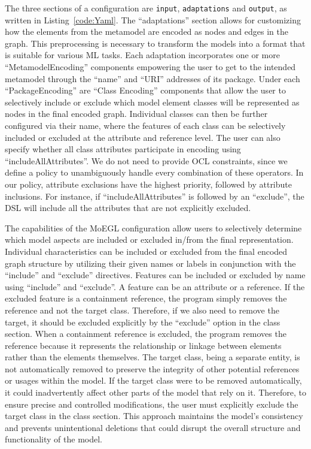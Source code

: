 \documentclass[journal,article,submit,moreauthors,technologies]{Definitions/mdpi}
\newcommand{\rev}[1]{#1}
\begin{document}
\rev{The three sections of a configuration are \texttt{input}, \texttt{adaptations} and \texttt{output}, as written in Listing~\ref{code:Yaml}.} The ``adaptations'' section allows for customizing how the elements from the metamodel are encoded as nodes and edges in the graph. This preprocessing is necessary to transform the models into a format that is suitable for various ML tasks. Each adaptation incorporates one or more ``MetamodelEncoding'' components empowering the user to get to the intended metamodel through the ``name'' and ``URI'' addresses of its package. Under each ``PackageEncoding'' are ``Class Encoding'' components that allow the user to selectively include or exclude which model element classes will be represented as nodes in the final encoded graph. Individual classes can then be further configured via their name, where the features of each class can be selectively included or excluded at the attribute and reference level. The user can also specify whether all class attributes participate in encoding using ``includeAllAttributes''. We do not need to provide OCL constraints, since we define a policy to unambiguously handle every combination of these operators. In our policy, attribute exclusions have the highest priority, followed by attribute inclusions. For instance, if ``includeAllAttributes'' is followed by an ``exclude'', the DSL will include all the attributes that are not explicitly excluded.

The capabilities of the MoEGL configuration allow users to selectively determine which model aspects are included or excluded in/from the final representation. Individual characteristics can be included or excluded from the final encoded graph structure by utilizing their given names or labels in conjunction with the ``include'' and ``exclude'' directives. Features can be included or excluded by name using ``include'' and ``exclude''. A feature can be an attribute or a reference. If the excluded feature is a containment reference, the program simply removes the reference and not the target class. Therefore, if we also need to remove the target, it should be excluded explicitly by the ``exclude'' option in the class section. When a containment reference is excluded, the program removes the reference because it represents the relationship or linkage between elements rather than the elements themselves. The target class, being a separate entity, is not automatically removed to preserve the integrity of other potential references or usages within the model. If the target class were to be removed automatically, it could inadvertently affect other parts of the model that rely on it. Therefore, to ensure precise and controlled modifications, the user must explicitly exclude the target class in the class section. This approach maintains the model's consistency and prevents unintentional deletions that could disrupt the overall structure and functionality of the model.
\end{document}
